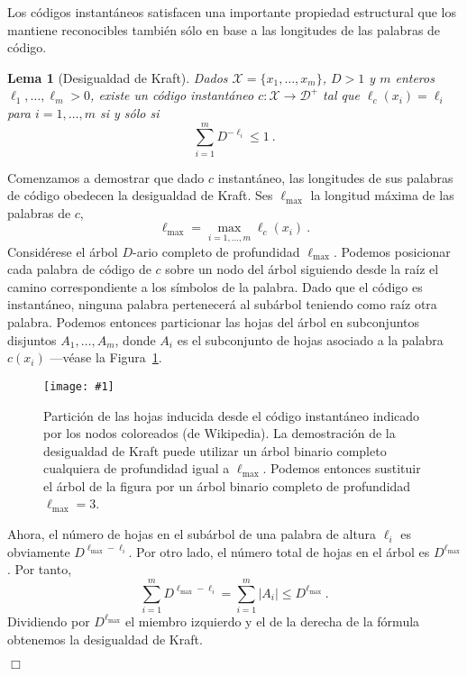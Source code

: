 \documentclass[11pt]{article}
\newtheorem{lemma}[theorem]{Lema}
\newenvironment{proof}{{\textsc{Demostración.}\ }}{\hfill$\Box$\\[2mm]}
\newcommand{\figscale}[2]{\texttt{[image: \#1]}}
\newcommand{\scD}{\mathcal{D}}
\newcommand{\scX}{\mathcal{X}}
\newcommand{\lmax}{\ell_{\textrm{max}}}
\begin{document}
Los códigos instantáneos satisfacen una importante propiedad estructural que los mantiene reconocibles también sólo en base a las longitudes de las palabras de código.
%
\begin{lemma}[Desigualdad de Kraft]
Dados $\scX = \{x_1,\dots,x_m\}$, $D > 1$ y $m$ enteros $\ell_1,\dots,\ell_m > 0$, existe un código instantáneo $c : \scX \to \scD^+$ tal que $\ell_c(x_i) = \ell_i$ para $i=1,\dots,m$ si y sólo si
\[
    \sum_{i=1}^m D^{-\ell_i} \le 1~.
\]
\end{lemma}
%
\begin{proof}
Comenzamos a demostrar que dado $c$ instantáneo, las longitudes de sus palabras de código obedecen la desigualdad de Kraft. Ses $\lmax$ la longitud máxima de las palabras de $c$,
\[
    \lmax = \max_{i=1,\dots,m} \ell_c(x_i)~.
\]
Considérese el árbol $D$-ario completo de profundidad $\lmax$. Podemos posicionar cada palabra de código de $c$ sobre un nodo del árbol siguiendo desde la raíz el camino correspondiente a los símbolos de la palabra. Dado que el código es instantáneo, ninguna palabra pertenecerá al subárbol teniendo como raíz otra palabra. Podemos entonces particionar las hojas del árbol en subconjuntos disjuntos $A_1,\dots,A_m$, donde $A_i$ es el subconjunto de hojas asociado a la palabra $c(x_i)$ ---véase la Figura~\ref{fig:kraft}.
%
\begin{figure}[h]
\begin{center}
\figscale{Images/kraft}{0.4}
\end{center}
\caption{
\label{fig:kraft}
Partición de las hojas inducida desde el código instantáneo indicado por los nodos coloreados (de Wikipedia). La demostración de la desigualdad de Kraft puede utilizar un árbol binario completo cualquiera de profundidad igual a $\lmax$. Podemos entonces sustituir el árbol de la figura por un árbol binario completo de profundidad $\lmax = 3$.
}
\end{figure}

Ahora, el número de hojas en el subárbol de una palabra de altura $\ell_i$ es obviamente $D^{\lmax-\ell_i}$. Por otro lado, el número total de hojas en el árbol es $D^{\lmax}$. Por tanto,
\[
    \sum_{i=1}^m D^{\lmax-\ell_i} = \sum_{i=1}^m |A_i| \le D^{\lmax}~.
\]
Dividiendo por $D^{\lmax}$ el miembro izquierdo y el de la derecha de la fórmula obtenemos la desigualdad de Kraft.


\end{proof}
\end{document}
